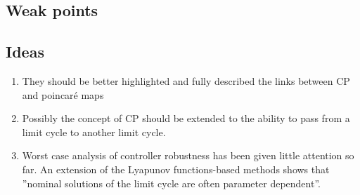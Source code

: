 \subsection*{Weak points}
\subsection*{Ideas}
\begin{enumerate}
\item They should be better highlighted and fully described the links between CP and poincaré maps
\item Possibly the concept of CP should be extended to the ability to pass from a limit cycle to another limit cycle.
\item Worst case analysis of controller robustness has been given little attention so far. An extension of the Lyapunov functions-based methods shows that ''nominal solutions of the limit cycle are often parameter dependent''.
\end{enumerate}
